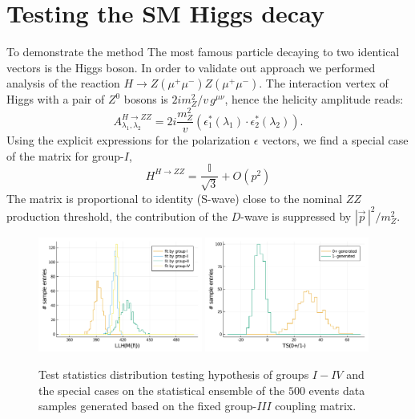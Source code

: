 \documentclass[prd,preprintnumbers,floatfix,
nofootinbib,superscriptaddress]{revtex4}
\newcommand{\I}{\ensuremath{I}}
\newcommand{\III}{\ensuremath{{I\!I\!I}}}
\newcommand{\IV}{\ensuremath{{I\!V}}}
\begin{document}
\section{Testing the SM Higgs decay} \label{sec:higgs}
To demonstrate the method
The most famous particle decaying to two identical vectors is the Higgs boson.
In order to validate out approach we performed analysis of the reaction $H\to Z(\mu^+\mu^-)Z(\mu^+\mu^-)$.
The interaction vertex of Higgs with a pair of $Z^0$ bosons is $2i m_Z^2/v\,g^{\mu\nu}$,
hence the helicity amplitude reads:
\begin{equation} \label{eq:HZZ}
  A^{H\to ZZ}_{\lambda_1,\lambda_2} = 2i\frac{m_Z^2}{v} (\epsilon_1^*(\lambda_1)\cdot\epsilon_2^*(\lambda_2)).
\end{equation}
Using the explicit expressions for the polarization $\epsilon$ vectors,
we find a special case of the matrix for group-$\I$,
\begin{equation}
  H^{H\to ZZ} = \frac{\mathbb{I}}{\sqrt{3}} + O(p^2)
\end{equation}
The matrix is proportional to identity (S-wave) close to the nominal $ZZ$ production threshold,
the contribution of the $D$-wave is suppressed by $|\vec p\,|^2/m_Z^2$.

\begin{figure}
  \includegraphics[width=0.48\textwidth]{../plots/llh_testing_higgs.pdf}
  \includegraphics[width=0.48\textwidth]{../plots/TS_0p_vs_1m.pdf}
  \caption{Test statistics distribution testing hypothesis of groups $\I-\IV$ and the special cases on the statistical ensemble of the $500$ events data samples generated based on
  the fixed group-$\III$ coupling matrix. }
  \label{fig:TS.fixedH}
\end{figure}
\end{document}
